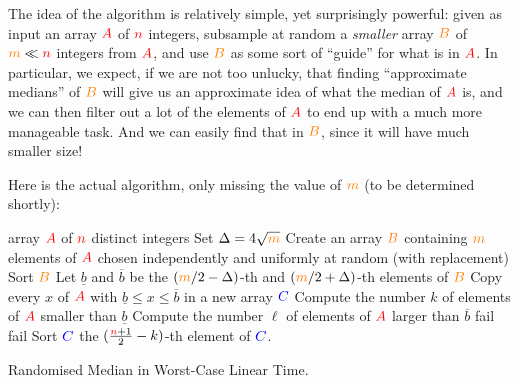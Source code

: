 The idea of the algorithm is relatively simple, yet surprisingly powerful: given as input an array $\textcolor{red}{A}$ of ${\textcolor{red}{n}}$ integers, subsample at random a \emph{smaller} array $\textcolor{orange}{B}$ of $\textcolor{orange}{m} \ll {\textcolor{red}{n}}$ integers from $\textcolor{red}{A}$, and use $\textcolor{orange}{B}$ as some sort of ``guide'' for what is in $\textcolor{red}{A}$. In particular, we expect, if we are not too unlucky, that finding ``approximate medians'' of $\textcolor{orange}{B}$ will give us an approximate idea of what the median of $\textcolor{red}{A}$ is, and we can then filter out a lot of the elements of $\textcolor{red}{A}$ to end up with a much more manageable task. And we can easily find that in $\textcolor{orange}{B}$, since it will have much smaller size!

Here is the actual algorithm, only missing the value of $\textcolor{orange}{m}$ (to be determined shortly):
\begin{algorithm}[H]
\begin{algorithmic}[1]
    \Require array $\textcolor{red}{A}$ of ${\textcolor{red}{n}}$ distinct integers
    \State Set $\Delta = 4\sqrt{\textcolor{orange}{m}}$ 
    \State Create an array $\textcolor{orange}{B}$ containing $\textcolor{orange}{m}$ elements of $\textcolor{red}{A}$ chosen independently and uniformly at random (with replacement)
    \State Sort $\textcolor{orange}{B}$ 
    \State Let $\underline{b}$ and $\overline{b}$ be the $(\textcolor{orange}{m}/2-\Delta)$-th and $(\textcolor{orange}{m}/2+\Delta)$-th elements of $\textcolor{orange}{B}$ 
    \State {}
    \State\label{step:lintime:1} Copy every $x$ of $\textcolor{red}{A}$ with $\underline{b}\leq x\leq \overline{b}$ in a new array $\textcolor{blue}{C}$
    \State\label{step:lintime:2} Compute the number $k$ of elements of $\textcolor{red}{A}$ smaller than $\underline{b}$ 
    \State\label{step:lintime:3} Compute the number $\ell$ of elements of $\textcolor{red}{A}$ larger than $\overline{b}$ 
        \State\Return \textsf{fail} 
        \State\Return \textsf{fail} 
    \Else
        \State Sort $\textcolor{blue}{C}$  
        \State\label{step:return:median}\Return the $(\frac{{\textcolor{red}{n}}+1}{2}-k)$-th element of $\textcolor{blue}{C}$.
    \EndIf
\end{algorithmic}
    \caption{Randomised Median in Worst-Case Linear Time.}
    \label{algo:randomized:median}
\end{algorithm}

